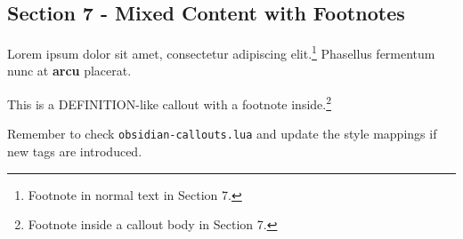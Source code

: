 \begin{tcolorbox}[breakable,colback=ocGryBack,colframe=ocGryFrame,coltitle=ocGryTitle,left=3mm,boxed title style={left=1mm},title={\hspace*{-2.5mm}\iconInfo\; md2pdf - inner without explicit \texttt{shift-heading=0}}]
\section*{Section 7 - Mixed Content with
Footnotes}\label{inner-2-section-7---mixed-content-with-footnotes}

Lorem ipsum dolor sit amet, consectetur adipiscing elit.\footnote{Footnote
  in normal text in Section 7.} Phasellus fermentum nunc at
\textbf{arcu} placerat.

\begin{tcolorbox}[breakable,colback=ocPinBack,colframe=ocPinFrame,coltitle=ocPinTitle,left=3mm,boxed title style={left=1mm},title={\hspace*{-2.5mm}\iconDefinition\; Definition with footnote}]

This is a DEFINITION-like callout with a footnote inside.\footnote{Footnote
  inside a callout body in Section 7.}

\end{tcolorbox}

\begin{tcolorbox}[breakable,colback=yellow!5!white,colframe=yellow!50!black,left=3mm,boxed title style={left=1mm},title={\hspace*{-2.5mm}\iconTodo\; TODO with inline code}]

Remember to check \texttt{obsidian-callouts.lua} and update the style
mappings if new tags are introduced.

\end{tcolorbox}

\end{tcolorbox}

